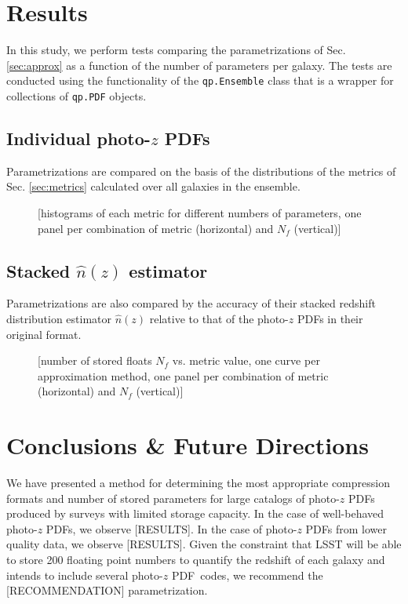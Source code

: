 \documentclass[\docopts]{\docclass}
\newcommand{\pz}{photo-$z$ PDF}
\begin{document}
\section{Results}
\label{sec:results}


In this study, we perform tests comparing the parametrizations of Sec. 
\ref{sec:approx} as a function of the number of parameters per galaxy.  The 
tests are conducted using the functionality of the \texttt{qp.Ensemble} class 
that is a wrapper for collections of \texttt{qp.PDF} objects.

\subsection{Individual \pz s}
\label{sec:individual}

Parametrizations are compared on the basis of the distributions of the metrics 
of Sec. \ref{sec:metrics} calculated over all galaxies in the ensemble.

\begin{figure}
  \caption{[histograms of each metric for different numbers of parameters, one 
panel per combination of metric (horizontal) and $N_{f}$ (vertical)]
  \label{fig:individual}}
\end{figure}

\subsection{Stacked $\hat{n}(z)$ estimator}
\label{sec:stacked}

Parametrizations are also compared by the accuracy of their stacked redshift 
distribution estimator $\hat{n}(z)$ relative to that of the \pz s in their 
original format.

\begin{figure}
  \caption{[number of stored floats $N_{f}$ vs. metric value, one curve per 
approximation method, one panel per combination of metric (horizontal) and 
$N_{f}$ (vertical)]
  \label{fig:stacked}}
\end{figure}





\section{Conclusions \& Future Directions}
\label{sec:conclusions}

We have presented a method for determining the most appropriate compression 
formats and number of stored parameters for large catalogs of \pz s produced by 
surveys with limited storage capacity.   In the case of well-behaved \pz s, we 
observe [RESULTS].  In the case of \pz s from lower quality data, we observe 
[RESULTS].  Given the constraint that LSST will be able to store 200 floating 
point numbers to quantify the redshift of each galaxy and intends to include 
several \pz\ codes, we recommend the [RECOMMENDATION] parametrization.
\end{document}
